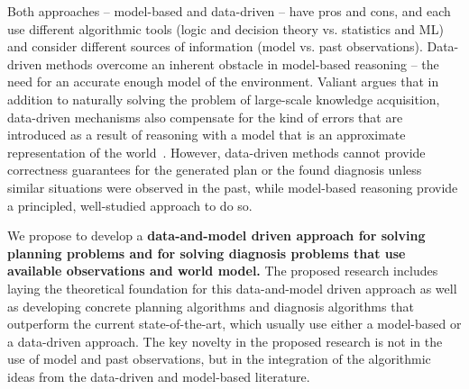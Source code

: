 \documentclass[12pt]{article}
\begin{document}
Both approaches -- model-based and data-driven --  have pros and cons, and each use different algorithmic tools (logic and decision theory vs. statistics and ML) and consider different sources of information (model vs. past observations). Data-driven methods overcome an inherent obstacle in model-based reasoning -- the need for an accurate enough model of the environment. Valiant argues that in addition to naturally solving the problem of large-scale knowledge acquisition, data-driven mechanisms also compensate for the kind of errors that 
are introduced as a result of  reasoning with a model that is an approximate representation of the world~\cite{valiant2000neuroidal,valiant2000robustLogics}. 
However, data-driven methods cannot provide correctness guarantees for the generated plan or the found diagnosis unless similar situations were observed in the past, 
while model-based reasoning provide a principled,  well-studied approach to do so. %


We propose to develop a {\bf data-and-model driven approach for solving planning problems and for solving diagnosis problems that use available observations and world model.} 
The proposed research includes laying the theoretical foundation for this data-and-model driven approach as well as developing concrete planning algorithms and diagnosis algorithms that outperform the current state-of-the-art, which usually use either a model-based or a data-driven approach. 
The key novelty in the proposed research is not in the use of model and past observations, but in 
 the integration of the algorithmic ideas from the data-driven and model-based literature. 

\end{document}
